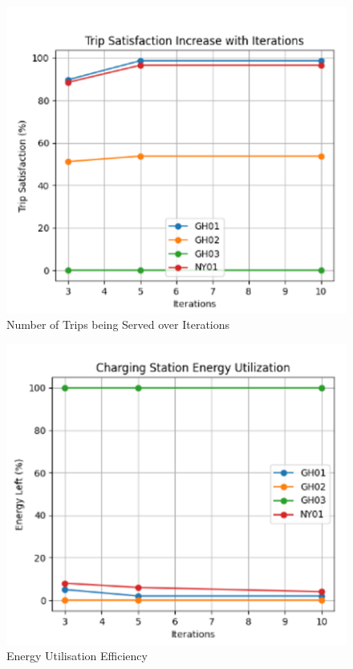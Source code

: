 \begin{figure}[h]
  \vspace{-0.2cm}
  \centering
  \includegraphics[scale=0.3]{Crest/Images/iterations.png}
  \caption{Number of Trips being Served over Iterations}
  \label{fig:iterations}
  \vspace{-0.1cm}
\end{figure}

\begin{figure}[h]
  \vspace{-0.2cm}
  \centering
  \includegraphics[scale=0.3]{Crest/Images/energy_charging_utilise.png}
  \caption{Energy Utilisation Efficiency}
  \label{fig:energy_charging_utilise}
  \vspace{-0.1cm}
\end{figure}


